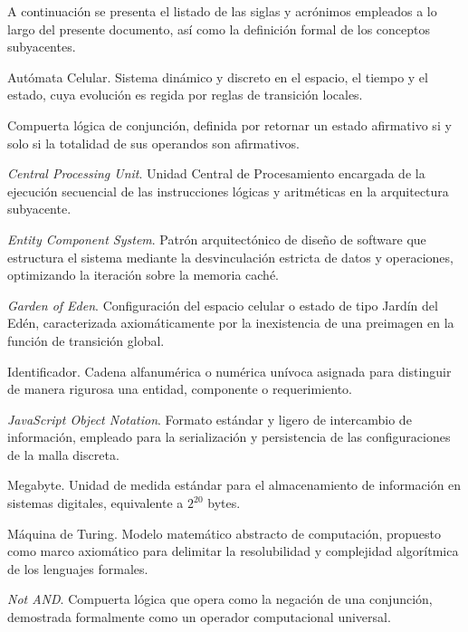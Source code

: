 %
%


A continuación se presenta el listado de las siglas y acrónimos empleados a lo largo del presente documento, así como la definición formal de los conceptos subyacentes.

\begin{description}[NAND]
\item[AC]{Autómata Celular. Sistema dinámico y discreto en el espacio, el tiempo y el estado, cuya evolución es regida por reglas de transición locales.}
\item[AND]{Compuerta lógica de conjunción, definida por retornar un estado afirmativo si y solo si la totalidad de sus operandos son afirmativos.}
\item[CPU]{\textit{Central Processing Unit}. Unidad Central de Procesamiento encargada de la ejecución secuencial de las instrucciones lógicas y aritméticas en la arquitectura subyacente.}
\item[ECS]{\textit{Entity Component System}. Patrón arquitectónico de diseño de software que estructura el sistema mediante la desvinculación estricta de datos y operaciones, optimizando la iteración sobre la memoria caché.}
\item[GE]{\textit{Garden of Eden}. Configuración del espacio celular o estado de tipo Jardín del Edén, caracterizada axiomáticamente por la inexistencia de una preimagen en la función de transición global.}
\item[ID]{Identificador. Cadena alfanumérica o numérica unívoca asignada para distinguir de manera rigurosa una entidad, componente o requerimiento.}
\item[JSON]{\textit{JavaScript Object Notation}. Formato estándar y ligero de intercambio de información, empleado para la serialización y persistencia de las configuraciones de la malla discreta.}
\item[MB]{Megabyte. Unidad de medida estándar para el almacenamiento de información en sistemas digitales, equivalente a $2^{20}$ bytes.}
\item[MT]{Máquina de Turing. Modelo matemático abstracto de computación, propuesto como marco axiomático para delimitar la resolubilidad y complejidad algorítmica de los lenguajes formales.}
\item[NAND]{\textit{Not AND}. Compuerta lógica que opera como la negación de una conjunción, demostrada formalmente como un operador computacional universal.}

\end{description}
